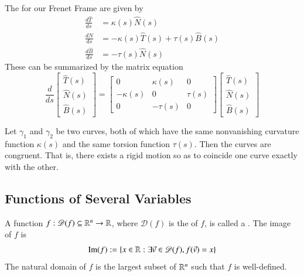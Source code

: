 \documentclass[12pt, a4paper, oneside, openright, titlepage]{book}
\begin{document}
\begin{appendices}
    \begin{prop}
        The  for our Frenet Frame are given by \begin{align*}
            \frac{d\hat{T}}{ds} &= \kappa(s)\hat{N}(s) \\
            \frac{d\hat{N}}{ds} &= -\kappa(s)\hat{T}(s)+\tau(s) \hat{B}(s) \\
            \frac{d\hat{B}}{ds} &= -\tau(s)\hat{N}(s)
        \end{align*}
        These can be summarized by the matrix equation \begin{equation*}
            \frac{d}{ds}\begin{bmatrix} \hat{T}(s) \\ \hat{N}(s) \\ \hat{B}(s) \end{bmatrix} = \begin{bmatrix} 0 & \kappa(s) & 0 \\ -\kappa(s) & 0 & \tau(s) \\ 0 & -\tau(s) & 0 \end{bmatrix} \begin{bmatrix} \hat{T}(s) \\ \hat{N}(s) \\ \hat{B}(s) \end{bmatrix} 
        \end{equation*}
    \end{prop}

    \begin{thm}
        Let $\gamma_1$ and $\gamma_2$ be two curves, both of which have the same nonvanishing curvature function $\kappa(s)$ and the same torsion function $\tau(s)$. Then the curves are congruent. That is, there exists a rigid motion so as to coincide one curve exactly with the other.
    \end{thm}





    \subsection{Functions of Several Variables}

    \begin{defn}
        A function $f:\mathscr{D}(f) \subseteq \mathbb R^n\rightarrow \mathbb R$, where $\mathscr{D}(f)$ is the  of $f$, is called a . The image of $f$ is \begin{equation}
            \operatorname{Im}(f):=\{x \in \mathbb R:\exists\vec{v} \in \mathscr{D}(f), f(\vec{v}) = x\}
        \end{equation}
        The natural domain of $f$ is the largest subset of $\mathbb R^n$ such that $f$ is well-defined.
    \end{defn}


\end{appendices}
\end{document}
